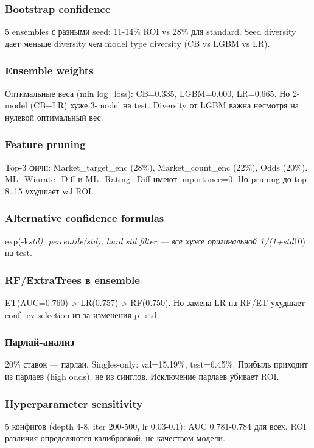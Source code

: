 \documentclass[12pt,a4paper]{article}
\begin{document}
\subsubsection{Bootstrap confidence}
5 ensembles с разными seed: 11-14\% ROI vs 28\% для standard. Seed diversity дает меньше diversity чем model type diversity (CB vs LGBM vs LR).

\subsubsection{Ensemble weights}
Оптимальные веса (min log\_loss): CB=0.335, LGBM=0.000, LR=0.665. Но 2-model (CB+LR) хуже 3-model на test. Diversity от LGBM важна несмотря на нулевой оптимальный вес.

\subsubsection{Feature pruning}
Top-3 фичи: Market\_target\_enc (28\%), Market\_count\_enc (22\%), Odds (20\%). ML\_Winrate\_Diff и ML\_Rating\_Diff имеют importance=0. Но pruning до top-8..15 ухудшает val ROI.

\subsubsection{Alternative confidence formulas}
exp(-k\textit{std), percentile(std), hard std filter — все хуже оригинальной 1/(1+std}10) на test.

\subsubsection{RF/ExtraTrees в ensemble}
ET(AUC=0.760) > LR(0.757) > RF(0.750). Но замена LR на RF/ET ухудшает conf\_ev selection из-за изменения p\_std.

\subsubsection{Парлай-анализ}
20\% ставок — парлаи. Singles-only: val=15.19\%, test=6.45\%. Прибыль приходит из парлаев (high odds), не из синглов. Исключение парлаев убивает ROI.

\subsubsection{Hyperparameter sensitivity}
5 конфигов (depth 4-8, iter 200-500, lr 0.03-0.1): AUC 0.781-0.784 для всех. ROI различия определяются калибровкой, не качеством модели.
\end{document}
